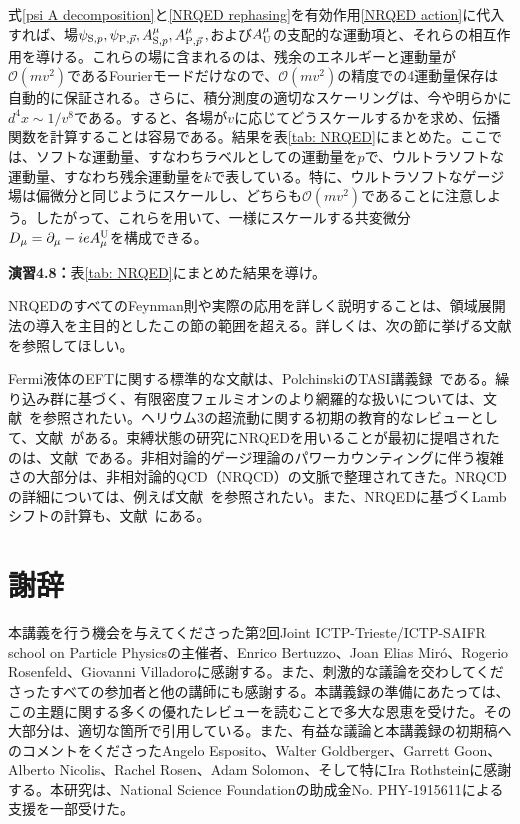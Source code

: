 式\eqref{psi A decomposition}と\eqref{NRQED rephasing}を有効作用\eqref{NRQED action}に代入すれば、場$\psi_{{\rm S}, p}, \psi_{{\rm P}, \vec p}, A_{{\rm S}, p}^\mu, A_{{\rm P}, \vec p}^\mu \, ,$および$A_{{\rm U}}^\mu$の支配的な運動項と、それらの相互作用を導ける。これらの場に含まれるのは、残余のエネルギーと運動量が$\mathcal{O}(mv^2)$であるFourierモードだけなので、$\mathcal{O}(mv^2)$の精度での4運動量保存は自動的に保証される。さらに、積分測度の適切なスケーリングは、今や明らかに$d^4x \sim 1/v^8$である。すると、各場が$v$に応じてどうスケールするかを求め、伝播関数を計算することは容易である。結果を表\ref{tab: NRQED}にまとめた。ここでは、ソフトな運動量、すなわちラベルとしての運動量を$p$で、ウルトラソフトな運動量、すなわち残余運動量を$k$で表している。特に、ウルトラソフトなゲージ場は偏微分と同じようにスケールし、どちらも$\mathcal{O} (mv^2)$であることに注意しよう。したがって、これらを用いて、一様にスケールする共変微分$D_\mu = \partial_\mu - i e A_\mu^{\rm U}$を構成できる。
 
%
\begin{eBox}
%
{\bf 演習4.8：}表\ref{tab: NRQED}にまとめた結果を導け。
\end{eBox}
% 
NRQEDのすべてのFeynman則や実際の応用を詳しく説明することは、領域展開法の導入を主目的としたこの節の範囲を超える。詳しくは、次の節に挙げる文献を参照してほしい。
  






Fermi液体のEFTに関する標準的な文献は、PolchinskiのTASI講義録~\cite{Polchinski:1992ed}である。繰り込み群に基づく、有限密度フェルミオンのより網羅的な扱いについては、文献~\cite{Shankar:1993pf}を参照されたい。ヘリウム3の超流動に関する初期の教育的なレビューとして、文献~\cite{Leggett:1975te}がある。束縛状態の研究にNRQEDを用いることが最初に提唱されたのは、文献~\cite{Caswell:1985ui}である。非相対論的ゲージ理論のパワーカウンティングに伴う複雑さの大部分は、非相対論的QCD（NRQCD）の文脈で整理されてきた。NRQCDの詳細については、例えば文献~\cite{Rothstein:2003mp,Griesshammer:1997wz}を参照されたい。また、NRQEDに基づくLambシフトの計算も、文献~\cite{Rothstein:2003mp}にある。

\newpage


\section*{謝辞}


本講義を行う機会を与えてくださった第2回Joint ICTP-Trieste/ICTP-SAIFR school on Particle Physicsの主催者、Enrico Bertuzzo、Joan Elias Mir\'o、Rogerio Rosenfeld、Giovanni Villadoroに感謝する。また、刺激的な議論を交わしてくださったすべての参加者と他の講師にも感謝する。本講義録の準備にあたっては、この主題に関する多くの優れたレビューを読むことで多大な恩恵を受けた。その大部分は、適切な箇所で引用している。また、有益な議論と本講義録の初期稿へのコメントをくださったAngelo Esposito、Walter Goldberger、Garrett Goon、Alberto Nicolis、Rachel Rosen、Adam Solomon、そして特にIra Rothsteinに感謝する。本研究は、National Science Foundationの助成金No. PHY-1915611による支援を一部受けた。

